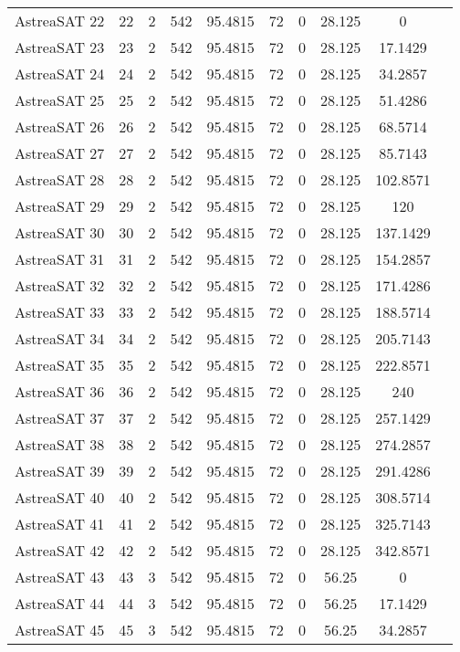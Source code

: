 \begin{longtable}{| c | c | c | c | c | c | c | c | c | c |}
AstreaSAT 22 & 22 & 2 & 542 & 95.4815 & 72 & 0 & 28.125 & 0 \\
AstreaSAT 23 & 23 & 2 & 542 & 95.4815 & 72 & 0 & 28.125 & 17.1429 \\ 
AstreaSAT 24 & 24 & 2 & 542 & 95.4815 & 72 & 0 & 28.125 & 34.2857 \\ 
AstreaSAT 25 & 25 & 2 & 542 & 95.4815 & 72 & 0 & 28.125 & 51.4286 \\ 
AstreaSAT 26 & 26 & 2 & 542 & 95.4815 & 72 & 0 & 28.125 & 68.5714 \\ 
AstreaSAT 27 & 27 & 2 & 542 & 95.4815 & 72 & 0 & 28.125 & 85.7143 \\ 
AstreaSAT 28 & 28 & 2 & 542 & 95.4815 & 72 & 0 & 28.125 & 102.8571 \\ 
AstreaSAT 29 & 29 & 2 & 542 & 95.4815 & 72 & 0 & 28.125 & 120 \\ 
AstreaSAT 30 & 30 & 2 & 542 & 95.4815 & 72 & 0 & 28.125 & 137.1429 \\ 
AstreaSAT 31 & 31 & 2 & 542 & 95.4815 & 72 & 0 & 28.125 & 154.2857 \\ 
AstreaSAT 32 & 32 & 2 & 542 & 95.4815 & 72 & 0 & 28.125 & 171.4286 \\ 
AstreaSAT 33 & 33 & 2 & 542 & 95.4815 & 72 & 0 & 28.125 & 188.5714 \\ 
AstreaSAT 34 & 34 & 2 & 542 & 95.4815 & 72 & 0 & 28.125 & 205.7143 \\ 
AstreaSAT 35 & 35 & 2 & 542 & 95.4815 & 72 & 0 & 28.125 & 222.8571 \\ 
AstreaSAT 36 & 36 & 2 & 542 & 95.4815 & 72 & 0 & 28.125 & 240 \\ 
AstreaSAT 37 & 37 & 2 & 542 & 95.4815 & 72 & 0 & 28.125 & 257.1429 \\ 
AstreaSAT 38 & 38 & 2 & 542 & 95.4815 & 72 & 0 & 28.125 & 274.2857 \\ 
AstreaSAT 39 & 39 & 2 & 542 & 95.4815 & 72 & 0 & 28.125 & 291.4286 \\ 
AstreaSAT 40 & 40 & 2 & 542 & 95.4815 & 72 & 0 & 28.125 & 308.5714 \\ 
AstreaSAT 41 & 41 & 2 & 542 & 95.4815 & 72 & 0 & 28.125 & 325.7143 \\ 
AstreaSAT 42 & 42 & 2 & 542 & 95.4815 & 72 & 0 & 28.125 & 342.8571 \\ 
AstreaSAT 43 & 43 & 3 & 542 & 95.4815 & 72 & 0 & 56.25 & 0 \\ 
AstreaSAT 44 & 44 & 3 & 542 & 95.4815 & 72 & 0 & 56.25 & 17.1429 \\ 
AstreaSAT 45 & 45 & 3 & 542 & 95.4815 & 72 & 0 & 56.25 & 34.2857 \\ 

\end{longtable}
